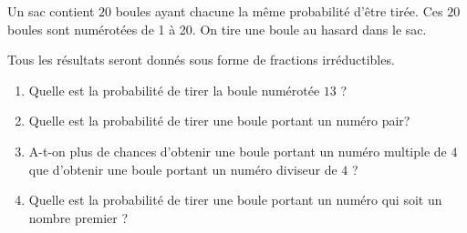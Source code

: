 
\medskip

Un sac contient $20$ boules ayant chacune la même probabilité d'être tirée. Ces $20$ boules sont numérotées de 1 à 20. On tire une boule au hasard dans le sac.

Tous les résultats seront donnés sous forme de fractions irréductibles.

\medskip

\begin{enumerate}
\item Quelle est la probabilité de tirer la boule numérotée $13$ ?
\item Quelle est la probabilité de tirer une boule portant un numéro pair?
\item A-t-on plus de chances d'obtenir une boule portant un numéro multiple de $4$ que d'obtenir une boule portant un numéro diviseur de $4$ ?
\item Quelle est la probabilité de tirer une boule portant un numéro qui soit un nombre premier ?
\end{enumerate}

\bigskip
 
